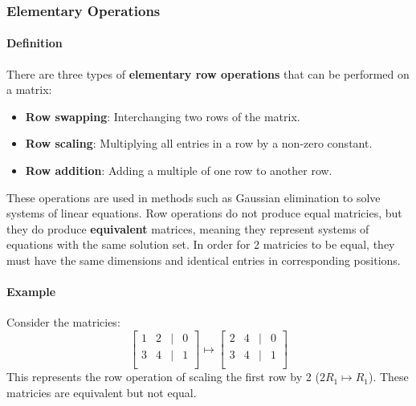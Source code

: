 \subsubsection*{Elementary Operations}
\paragraph*{Definition} There are three types of \textbf{elementary row operations} that can be performed on a matrix:
\begin{itemize}
    \item \textbf{Row swapping}: Interchanging two rows of the matrix.
    \item \textbf{Row scaling}: Multiplying all entries in a row by a non-zero constant.
    \item \textbf{Row addition}: Adding a multiple of one row to another row.
\end{itemize}

These operations are used in methods such as Gaussian elimination to solve systems of linear equations.
Row operations do not produce equal matricies, but they do produce \textbf{equivalent} matrices, meaning they represent systems of equations with the same solution set.
In order for 2 matricies to be equal, they must have the same dimensions and identical entries in corresponding positions.

\paragraph*{Example} Consider the matricies:
\[\begin{bmatrix}
    1 & 2 & | & 0 \\
    3 & 4 & | & 1 \\
\end{bmatrix} \mapsto \begin{bmatrix}
    2 & 4 & | & 0 \\
    3 & 4 & | & 1 \\
\end{bmatrix} \]
This represents the row operation of scaling the first row by 2 ($2R_1 \mapsto R_1$). These matricies are equivalent but not equal.

